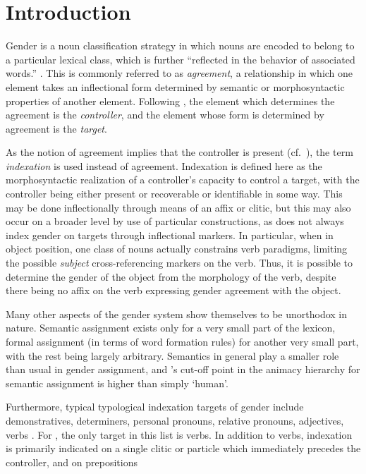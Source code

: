 \documentclass[output=collectionpaper,hidelinks]{langscibook}
\theoremstyle{remark}
\begin{document}
\section{Introduction}
\label{sec:Introduction}


Gender is a noun classification strategy in which nouns are encoded to belong to
a particular lexical class, which is further ``reflected in the behavior of
associated words.'' \citep[231]{Hockett1958}. This is commonly referred to as
\emph{agreement}, a relationship in which one element takes an inflectional form
determined by semantic or morphosyntactic properties of another element.
Following \cite{Corbett2006}, the element which determines the agreement is the
\emph{controller}, and the element whose form is determined by agreement is the
\emph{target}.

As the notion of agreement implies that the controller is present (cf.\
\citealt{Corbett2006}), the term \emph{indexation} is used instead of agreement.
Indexation is defined here as the morphosyntactic realization of a controller's
capacity to control a target, with the controller being either present or
recoverable or identifiable in some way.  This may be done inflectionally
through means of an affix or clitic, but this may also occur on a broader level
by use of particular constructions, as \ili{Uduk} does not always index gender on
targets through inflectional markers.  In particular, when in object position,
one class of nouns actually constrains verb paradigms, limiting the possible
\emph{subject} cross-referencing markers on the verb. Thus, it is possible to determine the gender of the object from the morphology of the verb, despite there being no affix on the verb expressing gender agreement with the object.

Many other aspects of the  gender system show themselves to be unorthodox in
nature. Semantic assignment exists only for a very small part of the lexicon,
formal assignment (in terms of word formation rules) for another very small
part, with the rest being largely arbitrary. Semantics in general play a smaller
role than usual in gender assignment, and \ili{Uduk}'s cut-off point in the animacy
hierarchy for semantic assignment is higher than simply `human'.

Furthermore, typical typological indexation targets of gender include
demonstratives, determiners, personal pronouns, relative pronouns, adjectives,
verbs \citep{DiGarbo2014}. For \ili{Uduk}, the only target in this list is verbs. In addition to verbs, indexation is primarily indicated on a single clitic or particle which immediately precedes the controller, and on prepositions
\end{document}
